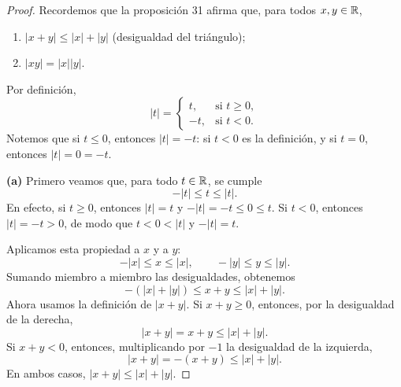 \documentclass[12pt,a4paper]{article}
\begin{document}
    \begin{proof}
        Recordemos que la proposición 31 afirma que, para todos $x,y\in\mathbb{R}$,
        \begin{enumerate}
            \item[(a)] $|x+y|\leq|x|+|y|$ (desigualdad del triángulo);
            \item[(b)] $|xy|=|x||y|$.
        \end{enumerate}
        Por definición,
        \begin{equation*}
            |t|=\begin{cases}
                t, & \text{si }t\geq 0,\\
                -t, & \text{si }t<0.
            \end{cases}
        \end{equation*}
        Notemos que si $t\leq0$, entonces $|t|=-t$: si $t<0$ es la definición, y si $t=0$, entonces $|t|=0=-t$.

        \textbf{(a)} Primero veamos que, para todo $t\in\mathbb{R}$, se cumple
        \begin{equation*}
            -|t|\leq t\leq|t|.
        \end{equation*}
        En efecto, si $t\geq0$, entonces $|t|=t$ y $-|t|=-t\leq0\leq t$. Si $t<0$, entonces $|t|=-t>0$, de modo que $t<0<|t|$ y $-|t|=t$.

        Aplicamos esta propiedad a $x$ y a $y$:
        \begin{equation*}
            -|x|\leq x\leq|x|,\qquad -|y|\leq y\leq|y|.
        \end{equation*}
        Sumando miembro a miembro las desigualdades, obtenemos
        \begin{equation*}
            -(|x|+|y|)\leq x+y\leq|x|+|y|.
        \end{equation*}
        Ahora usamos la definición de $|x+y|$. Si $x+y\geq0$, entonces, por la desigualdad de la derecha,
        \begin{equation*}
            |x+y|=x+y\leq|x|+|y|.
        \end{equation*}
        Si $x+y<0$, entonces, multiplicando por $-1$ la desigualdad de la izquierda,
        \begin{equation*}
            |x+y|=-(x+y)\leq|x|+|y|.
        \end{equation*}
        En ambos casos, $|x+y|\leq|x|+|y|$.


\end{proof}
\end{document}

